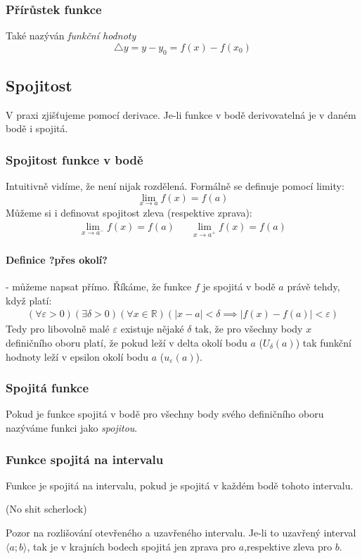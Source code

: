\documentclass[12pt]{article}
\providecommand{\abs}[1]{\lvert#1\rvert}
\newcommand{\nR}{\mathbb{R}} %
\begin{document}
\subsubsection{Přírůstek funkce}
Také nazýván \emph{funkční hodnoty}
\begin{equation}
\triangle y = y - y_0 = f(x) - f(x_0)
\end{equation}
\subsection{Spojitost}
V praxi zjišťujeme pomocí derivace. Je-li funkce v bodě derivovatelná je v daném bodě i spojitá.
\subsubsection{Spojitost funkce v bodě}
Intuitivně vidíme, že není nijak rozdělená. Formálně se definuje pomocí limity:
\begin{equation}
\lim_{x \to a} f(x) = f(a)
\end{equation}
Můžeme si i definovat spojitost zleva (respektive zprava):
\begin{align}
\lim_{x \to a^{-}} f(x) = f(a) && \lim_{x \to a^{+}} f(x) = f(a)
\end{align}
\paragraph{Definice ?přes okolí?} - můžeme napsat přímo. Říkáme, že funkce $f$ je spojitá v bodě $a$ právě tehdy, když platí:
\begin{align}
( \forall \varepsilon >0) ( \exists \delta >0) ( \forall x \in \nR) ( \abs{x-a} < \delta \implies \abs{f(x)-f(a)} < \varepsilon)
\end{align}
Tedy pro libovolně malé $\varepsilon$ existuje nějaké $\delta$ tak, že pro všechny body $x$ definičního oboru platí, že pokud leží v delta okolí bodu $a$ ($U{_\delta} (a)$) tak funkční hodnoty leží v epsilon okolí bodu $a$ ($u_{\varepsilon} (a)$).
\subsubsection{Spojitá funkce}
Pokud je funkce spojitá v bodě pro všechny body svého definičního oboru nazýváme funkci jako \emph{spojitou}.
\subsubsection{Funkce spojitá na intervalu}
Funkce je spojitá na intervalu, pokud je spojitá v každém bodě tohoto intervalu. \begin{scriptsize}
(No shit scherlock)
\end{scriptsize}
Pozor na rozlišování otevřeného a uzavřeného intervalu. Je-li to uzavřený interval $\langle a;b \rangle$, tak je v krajních bodech spojitá jen zprava pro $a$,respektive zleva pro $b$.
\end{document}
